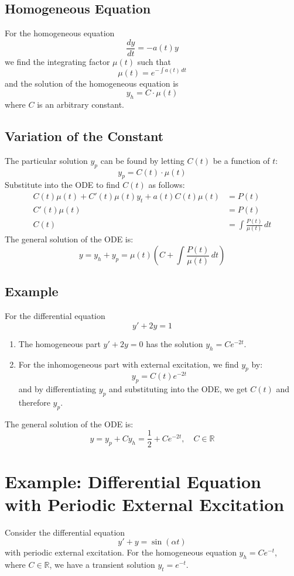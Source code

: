 \documentclass[11pt]{article}
\begin{document}
\subsection*{Homogeneous Equation}
For the homogeneous equation
\[ \frac{dy}{dt} = -a(t)y \]
we find the integrating factor \( \mu(t) \) such that
\[ \mu(t) = e^{-\int a(t) \, dt} \]
and the solution of the homogeneous equation is
\[ y_h = C \cdot \mu(t) \]
where \( C \) is an arbitrary constant.

\subsection*{Variation of the Constant}
The particular solution \( y_p \) can be found by letting \( C(t) \) be a function of \( t \):
\[ y_p = C(t) \cdot \mu(t) \]
Substitute into the ODE to find \( C(t) \) as follows:
\begin{align*}
C(t) \mu(t) + C'(t) \mu(t) y_t + a(t) C(t) \mu(t) &= P(t) \\
C'(t) \mu(t) &= P(t) \\
C(t) &= \int \frac{P(t)}{\mu(t)} \, dt
\end{align*}
The general solution of the ODE is:
\[ y = y_h + y_p = \mu(t) \left( C + \int \frac{P(t)}{\mu(t)} \, dt \right) \]

\subsection*{Example}
For the differential equation
\[ y' + 2y = 1 \]
\begin{enumerate}
    \item The homogeneous part \( y' + 2y = 0 \) has the solution \( y_h = C e^{-2t} \).
    \item For the inhomogeneous part with external excitation, we find \( y_p \) by:
    \[ y_p = C(t) e^{-2t} \]
    and by differentiating \( y_p \) and substituting into the ODE, we get \( C(t) \) and therefore \( y_p \).
\end{enumerate}
The general solution of the ODE is:
\[ y = y_p + C y_h = \frac{1}{2} + C e^{-2t}, \quad C \in \mathbb{R} \]



\section*{Example: Differential Equation with Periodic External Excitation}

Consider the differential equation
\[ y' + y = \sin(\alpha t) \]
with periodic external excitation. For the homogeneous equation \( y_h = C e^{-t} \), where \( C \in \mathbb{R} \), we have a transient solution \( y_t = e^{-t} \).
\end{document}
